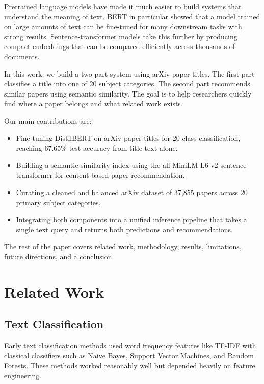 \documentclass[conference]{IEEEtran}
\begin{document}
Pretrained language models have made it much easier to build systems
that understand the meaning of text.  BERT \cite{devlin2018bert} in
particular showed that a model trained on large amounts of text can
be fine-tuned for many downstream tasks with strong results.
Sentence-transformer models \cite{reimers2019sentence} take this
further by producing compact embeddings that can be compared
efficiently across thousands of documents.

In this work, we build a two-part system using arXiv paper titles.
The first part classifies a title into one of 20 subject categories.
The second part recommends similar papers using semantic similarity.
The goal is to help researchers quickly find where a paper belongs
and what related work exists.

Our main contributions are:

\begin{itemize}
  \item Fine-tuning DistilBERT on arXiv paper titles for 20-class
    classification, reaching 67.65\% test accuracy from title text alone.
  \item Building a semantic similarity index using the all-MiniLM-L6-v2
    sentence-transformer for content-based paper recommendation.
  \item Curating a cleaned and balanced arXiv dataset of 37,855 papers
    across 20 primary subject categories.
  \item Integrating both components into a unified inference pipeline
    that takes a single text query and returns both predictions and
    recommendations.
\end{itemize}

The rest of the paper covers related work, methodology, results,
limitations, future directions, and a conclusion.

\section{Related Work}
\label{sec:related}

\subsection{Text Classification}

Early text classification methods used word frequency features like
TF-IDF with classical classifiers such as Naive Bayes, Support Vector
Machines, and Random Forests.  These methods worked reasonably well
but depended heavily on feature engineering.
\end{document}
